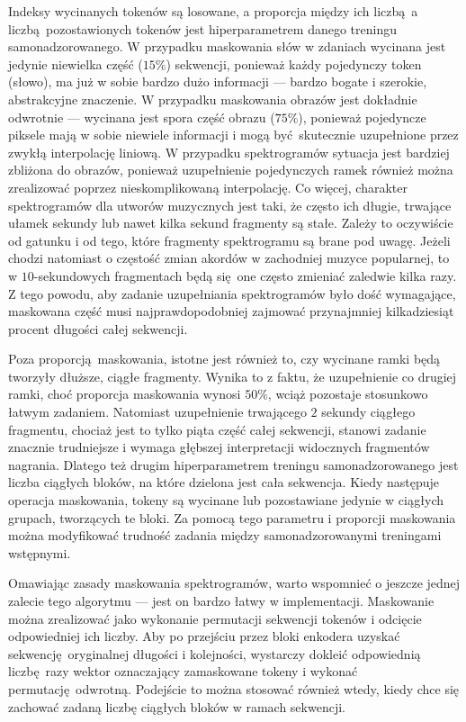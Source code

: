 Indeksy wycinanych tokenów są losowane, a proporcja między ich liczbą a liczbą pozostawionych
tokenów jest hiperparametrem danego treningu samonadzorowanego. W przypadku maskowania słów w
zdaniach \cite{devlin_bert_2019} wycinana jest jedynie niewielka część ($15\%$) sekwencji, ponieważ
każdy pojedynczy token (słowo), ma już w sobie bardzo dużo informacji --- bardzo bogate i szerokie,
abstrakcyjne znaczenie. W przypadku maskowania obrazów \cite{he_masked_2021} jest dokładnie
odwrotnie --- wycinana jest spora część obrazu ($75\%$), ponieważ pojedyncze piksele mają w sobie
niewiele informacji i mogą być skutecznie uzupełnione przez zwykłą interpolację liniową. W przypadku
spektrogramów sytuacja jest bardziej zbliżona do obrazów, ponieważ uzupełnienie pojedynczych ramek
również można zrealizować poprzez nieskomplikowaną interpolację. Co więcej, charakter spektrogramów
dla utworów muzycznych jest taki, że często ich długie, trwające ułamek sekundy lub nawet kilka
sekund fragmenty są stałe. Zależy to oczywiście od gatunku i od tego, które fragmenty spektrogramu
są brane pod uwagę. Jeżeli chodzi natomiast o częstość zmian akordów w zachodniej muzyce popularnej,
to w $10$-sekundowych fragmentach będą się one często zmieniać zaledwie kilka razy. Z tego powodu,
aby zadanie uzupełniania spektrogramów było dość wymagające, maskowana część musi najprawdopodobniej
zajmować przynajmniej kilkadziesiąt procent długości całej sekwencji.

Poza proporcją maskowania, istotne jest również to, czy wycinane ramki będą tworzyły dłuższe, ciągłe
fragmenty. Wynika to z faktu, że uzupełnienie co drugiej ramki, choć proporcja maskowania wynosi
$50\%$, wciąż pozostaje stosunkowo łatwym zadaniem. Natomiast uzupełnienie trwającego $2$ sekundy
ciągłego fragmentu, chociaż jest to tylko piąta część całej sekwencji, stanowi zadanie znacznie
trudniejsze i wymaga głębszej interpretacji widocznych fragmentów nagrania. Dlatego też drugim
hiperparametrem treningu samonadzorowanego jest liczba ciągłych bloków, na które dzielona jest cała
sekwencja. Kiedy następuje operacja maskowania, tokeny są wycinane lub pozostawiane jedynie w
ciągłych grupach, tworzących te bloki. Za pomocą tego parametru i proporcji maskowania można
modyfikować trudność zadania między samonadzorowanymi treningami wstępnymi.

Omawiając zasady maskowania spektrogramów, warto wspomnieć o jeszcze jednej zalecie tego algorytmu
--- jest on bardzo łatwy w implementacji. Maskowanie można zrealizować jako wykonanie permutacji
sekwencji tokenów i odcięcie odpowiedniej ich liczby. Aby po przejściu przez bloki enkodera uzyskać
sekwencję oryginalnej długości i kolejności, wystarczy dokleić odpowiednią liczbę razy wektor
oznaczający zamaskowane tokeny i wykonać permutację odwrotną. Podejście to można stosować również
wtedy, kiedy chce się zachować zadaną liczbę ciągłych bloków w ramach sekwencji.

